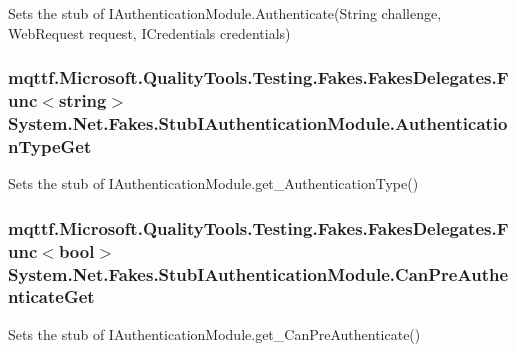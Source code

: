 Sets the stub of I\-Authentication\-Module.\-Authenticate(\-String challenge, Web\-Request request, I\-Credentials credentials)

\hypertarget{class_system_1_1_net_1_1_fakes_1_1_stub_i_authentication_module_a39eef45911fa228b38532a78f763ce5a}{
\subsubsection[{Authentication\-Type\-Get}]{\setlength{\rightskip}{0pt plus 5cm}mqttf.\-Microsoft.\-Quality\-Tools.\-Testing.\-Fakes.\-Fakes\-Delegates.\-Func$<$string$>$ System.\-Net.\-Fakes.\-Stub\-I\-Authentication\-Module.\-Authentication\-Type\-Get}}\label{class_system_1_1_net_1_1_fakes_1_1_stub_i_authentication_module_a39eef45911fa228b38532a78f763ce5a}


Sets the stub of I\-Authentication\-Module.\-get\-\_\-\-Authentication\-Type()

\hypertarget{class_system_1_1_net_1_1_fakes_1_1_stub_i_authentication_module_a4718edff5764d47e603d1b2f1aa18cbd}{
\subsubsection[{Can\-Pre\-Authenticate\-Get}]{\setlength{\rightskip}{0pt plus 5cm}mqttf.\-Microsoft.\-Quality\-Tools.\-Testing.\-Fakes.\-Fakes\-Delegates.\-Func$<$bool$>$ System.\-Net.\-Fakes.\-Stub\-I\-Authentication\-Module.\-Can\-Pre\-Authenticate\-Get}}\label{class_system_1_1_net_1_1_fakes_1_1_stub_i_authentication_module_a4718edff5764d47e603d1b2f1aa18cbd}


Sets the stub of I\-Authentication\-Module.\-get\-\_\-\-Can\-Pre\-Authenticate()

